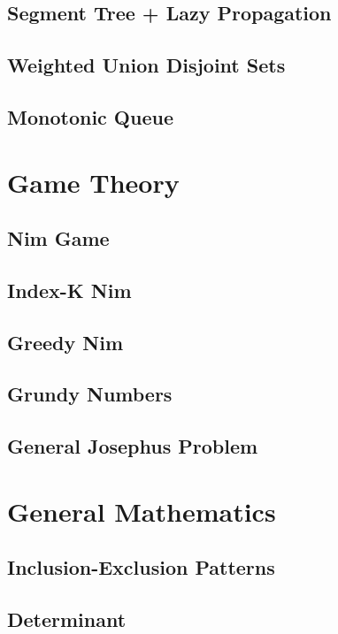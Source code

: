 		\subsection{Segment Tree + Lazy Propagation}
			
		\subsection{Weighted Union Disjoint Sets}
			
		\subsection{Monotonic Queue}
			
	\section{Game Theory}
		\subsection{Nim Game}
			
		\subsection{Index-K Nim}
			
		\subsection{Greedy Nim}
			
		\subsection{Grundy Numbers}
			
		\subsection{General Josephus Problem}
	\section{General Mathematics}
		\subsection{Inclusion-Exclusion Patterns}
			
		\subsection{Determinant}
			
